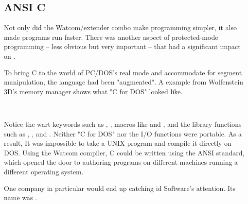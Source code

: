 \subsection{ANSI C}
Not only did the Watcom/extender combo make programming simpler, it also made programs run faster. There was another aspect of protected-mode programming -- less obvious but very important -- that had a significant impact on \doom.\\
\par
To bring C to the world of PC/DOS's real mode and accommodate for segment manipulation, the language had been "augmented". A example from Wolfenstein 3D's memory manager shows what "C for DOS" looked like.\\
\par
{}\\
\par
Notice the wart keywords such as , , macros like  and , and the  library functions such as , , and . Neither "C for DOS" nor the I/O functions were portable. As a result, It was impossible to take a UNIX program and compile it directly on DOS. Using the Watcom compiler, C could be written using the ANSI standard, which opened the door to authoring programs on different machines running a different operating system.\\
\par
 One company in particular would end up catching id Software's attention. Its name was \NeXTns.
